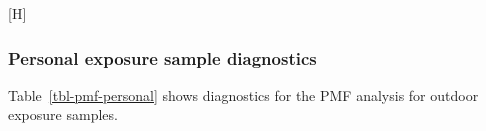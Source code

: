 \documentclass[
  letterpaper,
  DIV=11,
  numbers=noendperiod]{scrartcl}
\makeatletter
\renewenvironment{figure}%
   {\renewcommand\familydefault\sfdefault
    \@float{figure}}
   {\end@float}
\makeatother
\begin{document}
\begin{figure}[H]

\caption{\label{fig-pmf-sup}3-, 4-, and 5- factor solutions separately
for outdoor and personal exposure samples.}


\end{figure}%

\subsubsection{Personal exposure sample
diagnostics}\label{personal-exposure-sample-diagnostics}

Table~\ref{tbl-pmf-personal} shows diagnostics for the PMF analysis for
outdoor exposure samples.
\end{document}
